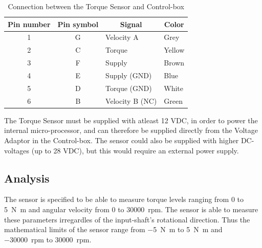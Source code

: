 \begin{table}[h]
	\centering
	\label{my-label}
	\begin{tabular}{|c|c|l|l|}
		\hline
		\textbf{Pin number} & \textbf{Pin symbol} & \multicolumn{1}{c|}{\textbf{Signal}} & \multicolumn{1}{c|}{\textbf{Color}} \\ \hline
		1                   & G                   & Velocity A                           & Grey                                \\ \hline
		2                   & C                   & Torque                               & Yellow                              \\ \hline
		3                   & F                   & Supply		                         & Brown                               \\ \hline
		4                   & E                   & Supply (GND)                         & Blue                                \\ \hline
		5                   & D                   & Torque (GND)                         & White                               \\ \hline
		6                   & B                   & Velocity B (NC)                      & Green                               \\ \hline
	\end{tabular}
	\caption{Connection between the Torque Sensor and Control-box}
\end{table}

The Torque Sensor must be supplied with atleast 12 VDC, in order to power the internal micro-processor, and can therefore be supplied directly from the Voltage Adaptor in the Control-box. The sensor could also be supplied with higher DC-voltages (up to 28 VDC), but this would require an external power supply.

\subsection{Analysis}
The sensor is specified to be able to measure torque levels ranging from 0 to \SI{5}{\newton \meter} and angular velocity from 0 to \SI{30000}{rpm}. The sensor is able to measure these parameters irregardles of the input-shaft's rotational direction. Thus the mathematical limits of the sensor range from \SI{-5}{\newton \meter} to \SI{+5}{\newton \meter} and \SI{-30000}{rpm} to \SI{+30000}{rpm}.


